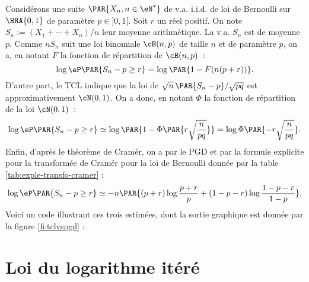 \begin{xpl}
  Considérons une suite $\PAR{X_n,n\in\eN^*}$ de v.a. i.i.d. de loi de
  Bernoulli sur $\BRA{0,1}$ de paramètre $p\in]0,1[$. Soit $r$ un réel
  positif. On note $S_n:=(X_1+\cdots+X_n)/n$ leur moyenne arithmétique. La
  v.a. $S_n$ est de moyenne $p$. Comme $nS_n$ suit une loi binomiale
  $\cB(n,p)$ de taille $n$ et de paramètre $p$, on a, en notant $F$ la
  fonction de répartition de $\cB(n,p)$~:
  $$
  \log \eP\PAR{S_n-p \geq r}= \log \PAR{1-F(n(p+r))}.
  $$
  D'autre part, le TCL indique que la loi de
  $\sqrt{n}\,\PAR{S_n-p}/\sqrt{pq}$ est approximativement $\cN(0,1)$. On a
  donc, en notant $\Phi$ la fonction de répartition de la loi $\cN(0,1)$~:
  $$
  \log \eP\PAR{S_n-p \geq r} \simeq \log \PAR{1-\Phi\PAR{r\sqrt{\frac{n}{pq}}}}
  = \log \Phi\PAR{-r\sqrt{\frac{n}{pq}}}.
  $$
  Enfin, d'après le théorème de Cramér, on a par le PGD et par la formule
  explicite pour la transformée de Cramér pour la loi de Bernoulli donnée par
  la table \ref{tab:exple-transfo-cramer} :
  $$
  \log \eP\PAR{S_n-p \geq r}
  \simeq -n\PAR{(p+r)\log\frac{p+r}{p} + (1-p-r)\log\frac{1-p-r}{1-p}}.
  $$  
  Voici un code \ML{} illustrant ces trois estimées, dont la sortie graphique
  est donnée par la figure \ref{fi:tclvspgd} :
\end{xpl}


%
\section{Loi du logarithme itéré}
%

